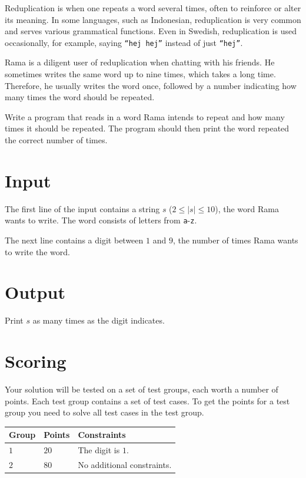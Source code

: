 \noindent

Reduplication is when one repeats a word several times, often to reinforce or alter its meaning.
In some languages, such as Indonesian, reduplication is very common and
serves various grammatical functions. Even in Swedish, reduplication is used
occasionally, for example, saying \texttt{``hej hej''} instead of just \texttt{``hej''}.

Rama is a diligent user of reduplication when chatting with his friends. He sometimes
writes the same word up to nine times, which takes a long time. Therefore, he usually
writes the word once, followed by a number indicating how many times the word should
be repeated.

Write a program that reads in a word Rama intends to repeat and how many times it
should be repeated. The program should then print the word repeated the correct number of times.

\section*{Input}
The first line of the input contains a string $s$ ($2 \leq |s| \leq 10$), the word Rama wants to write.
The word consists of letters from \texttt{a}-\texttt{z}.

The next line contains a digit between $1$ and $9$, the number of times Rama wants to write the word.

\section*{Output}
Print $s$ as many times as the digit indicates. 

\section*{Scoring}
Your solution will be tested on a set of test groups, each worth a number of points. Each test group contains
a set of test cases. To get the points for a test group you need to solve all test cases in the test group.

\noindent
\begin{tabular}{| l | l | p{12cm} |}
  \hline
  \textbf{Group} & \textbf{Points} & \textbf{Constraints} \\ \hline
  $1$    & $20$       & The digit is $1$. \\ \hline
  $2$    & $80$       & No additional constraints. \\ \hline
\end{tabular}
